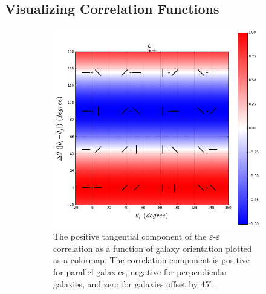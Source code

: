 \documentclass[%
 reprint,
 amsmath,amssymb,
 aps,nofootinbib
]{revtex4-1}
\begin{document}
\subsection{Visualizing Correlation Functions}

\begin{figure}[!b]
    \centering
    \begin{subfigure}{0.425\textwidth}
        \includegraphics[width=\textwidth]{figs-swe/xip_colormap.png}
        \captionsetup{justification=raggedright,singlelinecheck=false}
        \caption{The positive tangential component of the $\varepsilon$-$\varepsilon$ correlation as a function of galaxy orientation plotted as a colormap. The correlation component is positive for parallel galaxies, negative for perpendicular galaxies, and zero for galaxies offset by 45$^\circ$.}
        \label{xip_colormap}
    \end{subfigure}
    ~
    \begin{subfigure}{0.425\textwidth}

\end{subfigure}
\end{figure}
\end{document}
